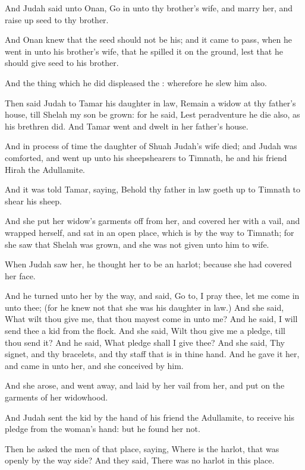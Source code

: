 \verse And Judah said unto Onan, Go in unto thy brother's wife, and marry her, and raise up seed to thy brother.

\verse And Onan knew that the seed should not be his; and it came to pass, when he went in unto his brother's wife, that he spilled it on the ground, lest that he should give seed to his brother.

\verse And the thing which he did displeased the \LORD: wherefore he slew him also.

\verse Then said Judah to Tamar his daughter in law, Remain a widow at thy father's house, till Shelah my son be grown: for he said, Lest peradventure he die also, as his brethren did. And Tamar went and dwelt in her father's house.

\verse And in process of time the daughter of Shuah Judah's wife died; and Judah was comforted, and went up unto his sheepshearers to Timnath, he and his friend Hirah the Adullamite.

\verse And it was told Tamar, saying, Behold thy father in law goeth up to Timnath to shear his sheep.

\verse And she put her widow's garments off from her, and covered her with a vail, and wrapped herself, and sat in an open place, which is by the way to Timnath; for she saw that Shelah was grown, and she was not given unto him to wife.

\verse When Judah saw her, he thought her to be an harlot; because she had covered her face.

\verse And he turned unto her by the way, and said, Go to, I pray thee, let me come in unto thee; (for he knew not that she was his daughter in law.) And she said, What wilt thou give me, that thou mayest come in unto me?  \verse And he said, I will send thee a kid from the flock.  And she said, Wilt thou give me a pledge, till thou send it?  \verse And he said, What pledge shall I give thee? And she said, Thy signet, and thy bracelets, and thy staff that is in thine hand. And he gave it her, and came in unto her, and she conceived by him.

\verse And she arose, and went away, and laid by her vail from her, and put on the garments of her widowhood.

\verse And Judah sent the kid by the hand of his friend the Adullamite, to receive his pledge from the woman's hand: but he found her not.

\verse Then he asked the men of that place, saying, Where is the harlot, that was openly by the way side? And they said, There was no harlot in this place.

